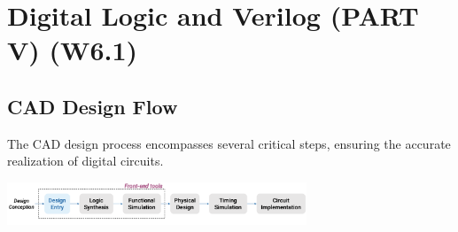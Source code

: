 \documentclass[12pt,openany]{book}
\begin{document}
			      	\chapter{Digital Logic and Verilog (PART V) (W6.1)}
			      	
			      	\section{CAD Design Flow}
			      	The CAD design process encompasses several critical steps, ensuring the accurate realization of digital circuits. 
			      	
			      	\begin{center}
			      		\includegraphics[width=0.67\textwidth]{circuits/10.1.png}
			      	\end{center}
			      	
			      	
			      	
\end{document}
